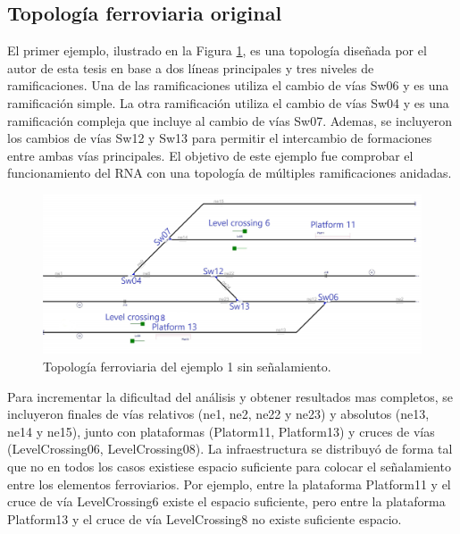 \subsection{Topología ferroviaria original}

	El primer ejemplo, ilustrado en la Figura \ref{fig:EJ1_1}, es una topología diseñada por el autor de esta tesis en base a dos líneas principales y tres niveles de ramificaciones. Una de las ramificaciones utiliza el cambio de vías Sw06 y es una ramificación simple. La otra ramificación utiliza el cambio de vías Sw04 y es una ramificación compleja que incluye al cambio de vías Sw07. Ademas, se incluyeron los cambios de vías Sw12 y Sw13 para permitir el intercambio de formaciones entre ambas vías principales. El objetivo de este ejemplo fue comprobar el funcionamiento del RNA con una topología de múltiples ramificaciones anidadas.
	
	\begin{figure}[h]
		\centering
		\includegraphics[width=1\textwidth]{resultados-obtenidos/ejemplo1/images/1_empty.png}
		\centering\caption{Topología ferroviaria del ejemplo 1 sin señalamiento.}
		\label{fig:EJ1_1}
	\end{figure}
	
	Para incrementar la dificultad del análisis y obtener resultados mas completos, se incluyeron finales de vías relativos (ne1, ne2, ne22 y ne23) y absolutos (ne13, ne14 y ne15), junto con plataformas (Platorm11, Platform13) y cruces de vías (LevelCrossing06, LevelCrossing08). La infraestructura se distribuyó de forma tal que no en todos los casos existiese espacio suficiente para colocar el señalamiento entre los elementos ferroviarios. Por ejemplo, entre la plataforma Platform11 y el cruce de vía LevelCrossing6 existe el espacio suficiente, pero entre la plataforma Platform13 y el cruce de vía LevelCrossing8 no existe suficiente espacio.